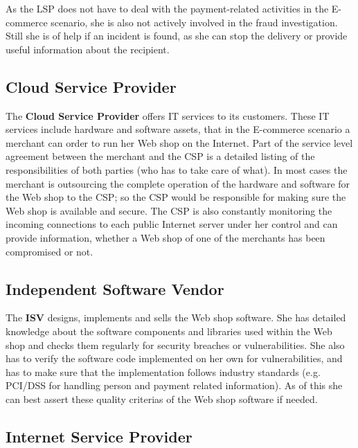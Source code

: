 As the \gls{LSP} does not have to deal with the payment-related activities in the E-commerce scenario, she is also not actively involved in the fraud investigation. Still she is of help if an incident is found, as she can stop the delivery or provide useful information about the recipient.


\subsection{Cloud Service Provider}
\label{subsec:stakeholder_csp}

The \textbf{Cloud Service Provider} offers IT services to its customers. These IT services include hardware and software assets, that in the E-commerce scenario a merchant can order to run her Web shop on the Internet. Part of the service level agreement between the merchant and the \gls{CSP} is a detailed listing of the responsibilities of both parties (who has to take care of what). In most cases the merchant is outsourcing the complete operation of the hardware and software for the Web shop to the \gls{CSP}; so the \gls{CSP} would be responsible for making sure the Web shop is available and secure. The \gls{CSP} is also constantly monitoring the incoming connections to each public Internet server under her control and can provide information, whether a Web shop of one of the merchants has been compromised or not.


\subsection{Independent Software Vendor}
\label{subsec:stakeholder_isv}

The \textbf{ISV} designs, implements and sells the Web shop software. She has detailed knowledge about the software components and libraries used within the Web shop and checks them regularly for security breaches or vulnerabilities. She also has to verify the software code implemented on her own for vulnerabilities, and has to make sure that the implementation follows industry standards (e.g. PCI/DSS for handling person and payment related information). As of this she can best assert these quality criterias of the Web shop software if needed.


\subsection{Internet Service Provider}
\label{subsec:stakeholder_isp}

